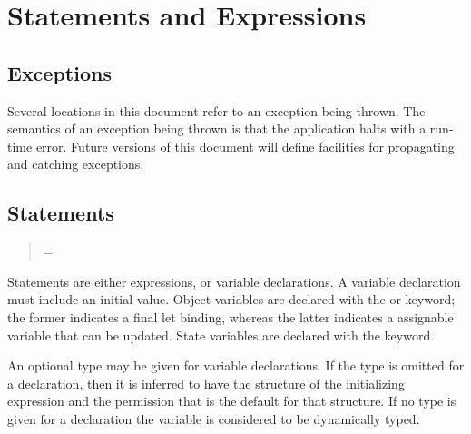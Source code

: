 \section{Statements and Expressions}

\subsection{Exceptions}

Several locations in this document refer to an exception being thrown.
The semantics of an exception being thrown is that the application
halts with a run-time error.  Future versions of this document will
define facilities for propagating and catching exceptions.

\subsection{Statements}


\begin{quote}

 {}

 {}

 {}



 {}   = 


 {}  



 {}

 {}

\end{quote}

Statements are either expressions, or variable declarations.  A
variable declaration must include an initial value.  Object variables are
declared with the  or  keyword; the former
indicates a final let binding, whereas the latter indicates a
assignable variable that can be updated.
State variables are declared with the  keyword. 

An optional type may be given for variable declarations.  If the type
is omitted for a  declaration, then it is inferred to have the
structure of the initializing expression and the permission that
is the default for that structure. If no type is given for a  
declaration the variable is considered to be dynamically typed.

